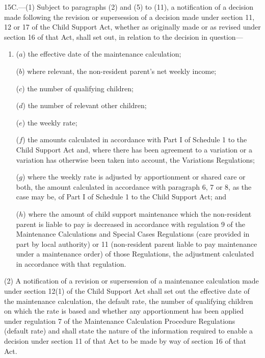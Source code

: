 \documentclass[12pt,a4paper]{article}
\begin{document}
15C.---(1)  Subject to paragraphs (2) and (5) to (11), a notification of a decision made following the revision or supersession of a decision made under section 11, 12 or 17 of the Child Support Act, whether as originally made or as revised under section 16 of that Act, shall set out, in relation to the decision in question—
\begin{enumerate}\item[]
($a$) the effective date of the maintenance calculation;

($b$) where relevant, the non-resident parent’s net weekly income;

($c$) the number of qualifying children;

($d$) the number of relevant other children;

($e$) the weekly rate;

($f$) the amounts calculated in accordance with Part I of Schedule 1 to the Child Support Act and, where there has been agreement to a variation or a variation has otherwise been taken into account, the Variations Regulations;

($g$) where the weekly rate is adjusted by apportionment or shared care or both, the amount calculated in accordance with paragraph 6, 7 or 8, as the case may be, of Part I of Schedule 1 to the Child Support Act; and

($h$) where the amount of child support maintenance which the non-resident parent is liable to pay is decreased in accordance with regulation 9 of the Maintenance Calculations and Special Cases Regulations (care provided in part by local authority) or 11 (non-resident parent liable to pay maintenance under a maintenance order) of those Regulations, the adjustment calculated in accordance with that regulation.
\end{enumerate}

(2) A notification of a revision or supersession of a maintenance calculation made under section 12(1) of the Child Support Act shall set out the effective date of the maintenance calculation, the default rate, the number of qualifying children on which the rate is based and whether any apportionment has been applied under regulation 7 of the Maintenance Calculation Procedure Regulations (default rate) and shall state the nature of the information required to enable a decision under section 11 of that Act to be made by way of section 16 of that Act.
\end{document}
